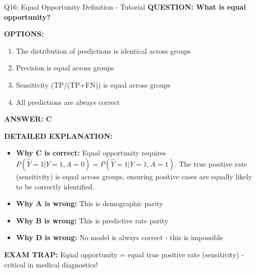 \documentclass[8pt]{beamer}
\begin{document}
	\begin{frame}{Q16: Equal Opportunity Definition - Tutorial}
		\fontsize{6.5}{7.5}\selectfont
		\textbf{QUESTION: What is equal opportunity?}
		
		\vspace{0.1cm}
		\textbf{OPTIONS:}
		\begin{enumerate}
			\item The distribution of predictions is identical across groups
			\item Precision is equal across groups
			\item Sensitivity (TP/(TP+FN)) is equal across groups
			\item All predictions are always correct
		\end{enumerate}
		
		\vspace{0.1cm}
		\textcolor{myblue}{\textbf{ANSWER: C}}
		
		\vspace{0.1cm}
		\textbf{DETAILED EXPLANATION:}
		\begin{itemize}
			\item \textbf{Why C is correct:} Equal opportunity requires $P(\hat{Y}=1|Y=1,A=0) = P(\hat{Y}=1|Y=1,A=1)$. The true positive rate (sensitivity) is equal across groups, ensuring positive cases are equally likely to be correctly identified.
			\item \textbf{Why A is wrong:} This is demographic parity
			\item \textbf{Why B is wrong:} This is predictive rate parity
			\item \textbf{Why D is wrong:} No model is always correct - this is impossible
		\end{itemize}
		
		\textcolor{myred}{\textbf{EXAM TRAP:}} Equal opportunity = \textcolor{myblue}{equal true positive rate (sensitivity)} - critical in medical diagnostics!
	\end{frame}
	
\end{document}
